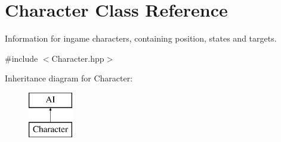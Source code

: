 \hypertarget{class_character}{}\section{Character Class Reference}
\label{class_character}


Information for ingame characters, containing position, states and targets.  




{\ttfamily \#include $<$Character.\+hpp$>$}

Inheritance diagram for Character\+:\begin{figure}[H]
\begin{center}
\leavevmode
\includegraphics[height=2.000000cm]{class_character}
\end{center}
\end{figure}
